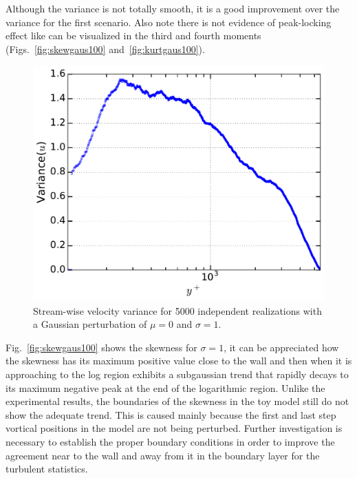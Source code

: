 \documentclass[aps,reprint,amsmath,amssymb,pra]{revtex4-1}%
\begin{document}
Although the variance is not totally smooth, it is a good improvement over the variance for the first scenario. Also note there is not evidence of peak-locking effect like can be visualized in the third and fourth moments (Figs.~\ref{fig:skewgaus100} and~\ref{fig:kurtgaus100}). 
\begin{figure}[b]
\includegraphics[scale=0.46]{figures/variance_5000_assembles_gauss100}
\caption{\label{fig:varigaus100} Stream-wise velocity variance for 5000 independent realizations with a Gaussian perturbation of $\mu=0$ and $\sigma=1$.}
\end{figure}
Fig.~\ref{fig:skewgaus100} shows the skewness for $\sigma=1$, it can be appreciated how the skewness has its maximum positive value close to the wall and then when it is approaching to the log region exhibits a subgaussian trend that rapidly decays to its maximum negative peak at the end of the logarithmic region. Unlike the experimental results, the boundaries of the skewness in the toy model still do not show the adequate trend. This is caused mainly because the first and last step vortical positions in the model are not being perturbed. Further investigation is necessary to establish the proper boundary conditions in order to improve the agreement near to the wall and away from it in the boundary layer for the turbulent statistics.
\end{document}
